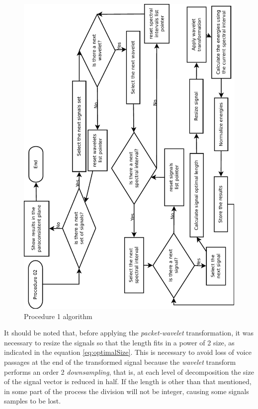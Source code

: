 			\begin{figure}[H]
				\centering
				\includegraphics[angle=-90,width=1\linewidth]{images/AlgoProcedure01.pdf}
				\caption{Procedure 1 algorithm}
				\label{fig:experiment01Algo}
			\end{figure}
			
			\par It should be noted that, before applying the \textit{packet-wavelet} transformation, it was necessary to resize the signals so that the length fits in a power of 2 size, as indicated in the equation \ref{eq:optimalSize}. This is necessary to avoid loss of voice passages at the end of the transformed signal because the \textit{wavelet} transform performs an order 2 \textit{downsampling}, that is, at each level of decomposition the size of the signal vector is reduced in half. If the length is other than that mentioned, in some part of the process the division will not be integer, causing some signals samples to be lost.
			
